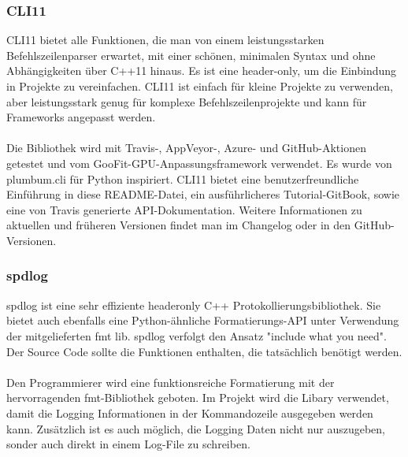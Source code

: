 \documentclass[a4paper,12pt]{article}
\begin{document}
\subsubsection{CLI11}
CLI11 bietet alle Funktionen, die man von einem leistungsstarken Befehlszeilenparser erwartet, mit einer schönen, minimalen Syntax und ohne 
Abhängigkeiten über C++11 hinaus. Es ist eine header-only, um die Einbindung in Projekte zu 
vereinfachen. CLI11 ist einfach für kleine Projekte zu verwenden, aber leistungsstark genug für komplexe Befehlszeilenprojekte und kann für Frameworks angepasst werden. \\\\
Die Bibliothek wird mit Travis-, AppVeyor-, Azure- und GitHub-Aktionen getestet und vom GooFit-GPU-Anpassungsframework verwendet. 
Es wurde von plumbum.cli für Python inspiriert. CLI11 bietet eine benutzerfreundliche Einführung in diese README-Datei, ein ausführlicheres Tutorial-GitBook, sowie eine von Travis generierte API-Dokumentation. 
Weitere Informationen zu aktuellen und früheren Versionen findet man im Changelog oder in den GitHub-Versionen.
\cite{cli11}
\subsubsection{spdlog}
spdlog ist eine sehr effiziente headeronly C++ Protokollierungsbibliothek. Sie bietet auch ebenfalls eine Python-ähnliche Formatierungs-API unter Verwendung der mitgelieferten fmt lib.
spdlog verfolgt den Ansatz "include what you need". Der Source Code sollte die Funktionen enthalten, die tatsächlich benötigt werden.\\\\
Den Programmierer wird eine funktionsreiche Formatierung mit der hervorragenden fmt-Bibliothek geboten.
Im Projekt wird die Libary verwendet, damit die Logging Informationen in der Kommandozeile ausgegeben werden kann. Zusätzlich ist es auch möglich,
die Logging Daten nicht nur auszugeben, sonder auch direkt in einem Log-File zu schreiben.
\cite{spdlog}
\end{document}
